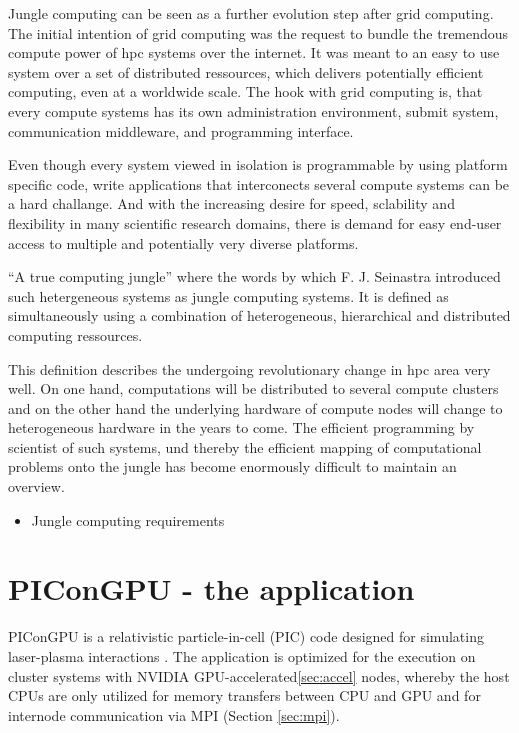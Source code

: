 Jungle computing can be seen as a further evolution step after
grid computing. The initial intention of grid computing was
the request to bundle the tremendous compute power of hpc
systems over the internet\cite{ref:grid}. It was meant to an
easy to use system over a set of distributed ressources, which
delivers potentially efficient computing, even at a worldwide scale.
The hook with grid computing is, that every compute systems has its
own administration environment, submit system, communication middleware,
and programming interface. 

Even though every system viewed in isolation is programmable by using
platform specific code, write applications that interconects several
compute systems can be a hard challange. And with the increasing
desire for speed, sclability and flexibility in many scientific research
domains, there is demand for easy end-user access to multiple and potentially
very diverse platforms.

``A true computing jungle'' where the words by which F. J. Seinastra
introduced such hetergeneous systems as jungle computing
systems\cite{ref:jungle}. It is defined as simultaneously using a
combination of heterogeneous, hierarchical and distributed computing
ressources.

This definition describes the undergoing revolutionary change in 
hpc area very well. On one hand, computations will be distributed
to several compute clusters and on the other hand the underlying
hardware of compute nodes will change to heterogeneous hardware in
the years to come. The efficient programming by scientist of such systems, 
und thereby the efficient mapping of computational problems onto
the jungle has become enormously difficult to maintain an overview.


\begin{itemize}
  \item Jungle computing requirements
\end{itemize}


\section{PIConGPU - the application}
\label{sec:picongpu}
PIConGPU is a relativistic particle-in-cell (PIC) code designed for
simulating laser-plasma interactions \cite{ref:picongpu}. The
application is optimized for the execution on cluster systems with
NVIDIA GPU-accelerated\ref{sec:accel} nodes, whereby the host CPUs are
only utilized for memory transfers between CPU and GPU and for
internode communication via MPI (Section \ref{sec:mpi}).

